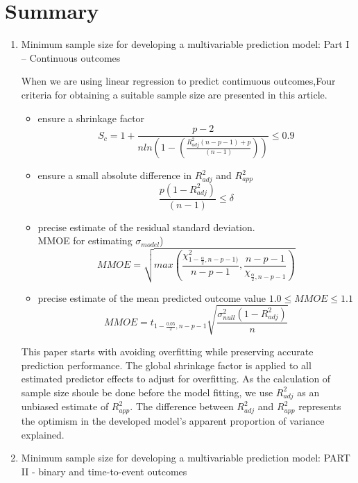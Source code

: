 \documentclass[
11pt, %
english, %
singlespacing, %
headsepline, %
]{MastersDoctoralThesis} %
\begin{document}
\chapter{Summary} 

\label{Summary}
\begin{enumerate}


\item Minimum sample size for developing a multivariable
prediction model: Part I – Continuous outcomes

When we are using linear regression to predict contimuous outcomes,Four criteria for obtaining a suitable sample size are presented in this article. 
\begin{itemize}
    \item  ensure a shrinkage factor 
    $$S_{c} = 1 + \frac{p-2}{n ln(1-(\frac{R^{2}_{adj}(n-p-1)+p}{(n-1)}))}\le 0.9$$
    \item  ensure a small absolute
difference in $R^{2}_{adj}$ and $R^{2}_{app}$
$$\frac{p(1-R^{2}_{adj})}{(n-1)}\le \delta$$
    \item precise estimate of the residual standard deviation. 
    \\MMOE for estimating $\sigma_{model}$)
    $$MMOE = \sqrt{max(\frac{\chi_{1-\frac{\alpha}{2},n-p-1)}^{2}}{n-p-1},\frac{n-p-1}{\chi_{\frac{\alpha}{2},n-p-1}})}$$
    \item precise estimate of the mean predicted outcome value $1.0\le MMOE \le 1.1$
    $$MMOE = t_{1-\frac{0.05}{2},n-p-1}\sqrt{\frac{\sigma^{2}_{null}(1-R^{2}_{adj})}{n}}$$  
\end{itemize}

This paper starts with avoiding overfitting while preserving accurate prediction performance. The global shrinkage factor is applied  to all estimated predictor effects to adjust for overfitting. As the calculation of sample size shoule be done before the model fitting, we use $R^{2}_{adj}$ as an unbiased estimate of $R^{2}_{app}$. The difference between $R^{2}_{adj}$ and $R^{2}_{app}$ represents the optimism in the developed model's apparent proportion of variance explained.\\

\item Minimum sample size for developing a multivariable prediction model: PART II - binary and time-to-event outcomes


\end{enumerate}
\end{document}
